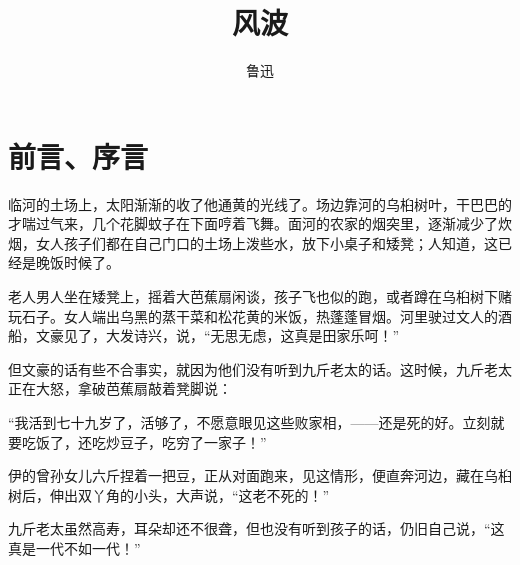 \documentclass[12pt,UTF8]{ctexbook}
\title{\heiti\zihao{0} 风波}
\author{鲁迅}
\date{}
\begin{document}
\maketitle
\tableofcontents

\frontmatter
\chapter{前言、序言}

\mainmatter

临河的土场上，太阳渐渐的收了他通黄的光线了。场边靠河的乌桕树叶，干巴巴的才喘过气来，几个花脚蚊子在下面哼着飞舞。面河的农家的烟突里，逐渐减少了炊烟，女人孩子们都在自己门口的土场上泼些水，放下小桌子和矮凳；人知道，这已经是晚饭时候了。

老人男人坐在矮凳上，摇着大芭蕉扇闲谈，孩子飞也似的跑，或者蹲在乌桕树下赌玩石子。女人端出乌黑的蒸干菜和松花黄的米饭，热蓬蓬冒烟。河里驶过文人的酒船，文豪见了，大发诗兴，说，“无思无虑，这真是田家乐呵！”

但文豪的话有些不合事实，就因为他们没有听到九斤老太的话。这时候，九斤老太正在大怒，拿破芭蕉扇敲着凳脚说：

“我活到七十九岁了，活够了，不愿意眼见这些败家相，——还是死的好。立刻就要吃饭了，还吃炒豆子，吃穷了一家子！”

伊的曾孙女儿六斤捏着一把豆，正从对面跑来，见这情形，便直奔河边，藏在乌桕树后，伸出双丫角的小头，大声说，“这老不死的！”

九斤老太虽然高寿，耳朵却还不很聋，但也没有听到孩子的话，仍旧自己说，“这真是一代不如一代！”
\end{document}

